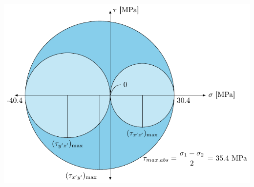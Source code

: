 \documentclass[10pt, svgnames]{beamer}
\begin{document}
\begin{frame}[label={sec:orgcf6b0f5}]{}
\begin{center}
\includegraphics[width=.9\linewidth]{pictures/max-abs-shear-stress-example.pdf}
\end{center}
\end{frame}
\end{document}
